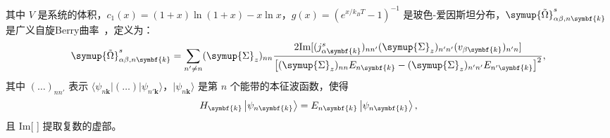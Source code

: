     其中 $V$ 是系统的体积，$c_1(x)=(1+x)\ln(1+x)-x\ln x$，$g(x)=(e^{x/k_B T}-1)^{-1}$ 是玻色-爱因斯坦分布，$\symup{\tilde{\Omega}}^s_{\alpha\beta,n{\symbf{k}}}$ 是广义自旋Berry曲率~\cite{li2020intrinsic,ma2021Intrinsic}，定义为：
    \begin{equation}
        \symup{\tilde{\Omega}}^s_{\alpha\beta,n{\symbf{k}}}=\sum_{n'\neq n}(\symup{\Sigma}_z)_{nn}\frac{2\text{Im}[(j^s_{\alpha{\symbf{k}}})_{nn'}(\symup{\Sigma}_z)_{n'n'}(v_{\beta{\symbf{k}}})_{n'n}]}{\left[(\symup{\Sigma}_z)_{nn}E_{n{\symbf{k}}}-(\symup{\Sigma}_z)_{n'n'}E_{n'{\symbf{k}}}\right]^2},
        \label{GsBC}
    \end{equation}
    其中 $(\dots)_{nn'}$ 表示 $\langle\psi_{n{\symbf{k}}}|(\dots)|\psi_{n'{\symbf{k}}}\rangle$，$|\psi_{n{\symbf{k}}}\rangle$ 是第 $n$ 个能带的本征波函数，使得
    \begin{equation}
        H_{\symbf{k}} \ket{\psi_{n{\symbf{k}}}} = E_{n{\symbf{k}}} \ket{\psi_{n{\symbf{k}}}},
    \end{equation}
    且 Im[ ] 提取复数的虚部。
    
